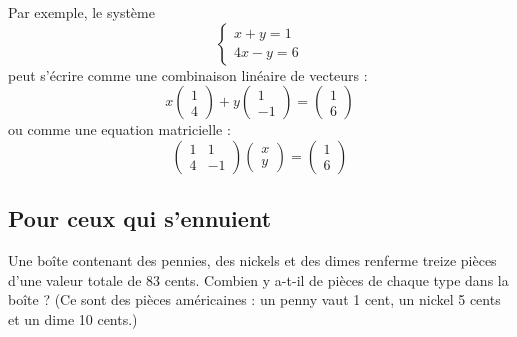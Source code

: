 Par exemple, le système 
$$\begin{cases}
x + y = 1 \\
4x - y = 6
\end{cases}$$
peut s'écrire comme une combinaison linéaire de vecteurs :
$$x\begin{pmatrix}1\\4\end{pmatrix} + y\begin{pmatrix}1\\-1\end{pmatrix} = \begin{pmatrix}1\\6\end{pmatrix}$$
ou comme une equation matricielle :
$$\begin{pmatrix}1&1\\4&-1\end{pmatrix}\begin{pmatrix}x\\y\end{pmatrix} = \begin{pmatrix}1\\6\end{pmatrix}$$

\vspace{2em}
\subsection{Pour ceux qui s'ennuient}
Une boîte contenant des pennies, des nickels et des dimes renferme treize pièces d'une valeur totale de 83 cents.
Combien y a-t-il de pièces de chaque type dans la boîte ?
(Ce sont des pièces américaines : un penny vaut 1 cent, un nickel 5 cents et un dime 10 cents.)

